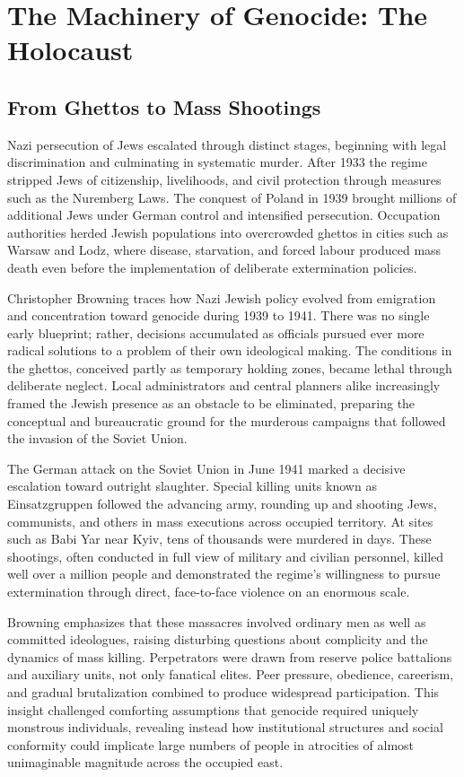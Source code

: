 \section{The Machinery of Genocide: The Holocaust}

\subsection{From Ghettos to Mass Shootings}
Nazi persecution of Jews escalated through distinct stages, beginning with legal discrimination and culminating in systematic murder. After 1933 the regime stripped Jews of citizenship, livelihoods, and civil protection through measures such as the Nuremberg Laws. The conquest of Poland in 1939 brought millions of additional Jews under German control and intensified persecution. Occupation authorities herded Jewish populations into overcrowded ghettos in cities such as Warsaw and Lodz, where disease, starvation, and forced labour produced mass death even before the implementation of deliberate extermination policies.

Christopher Browning traces how Nazi Jewish policy evolved from emigration and concentration toward genocide during 1939 to 1941. There was no single early blueprint; rather, decisions accumulated as officials pursued ever more radical solutions to a problem of their own ideological making. The conditions in the ghettos, conceived partly as temporary holding zones, became lethal through deliberate neglect. Local administrators and central planners alike increasingly framed the Jewish presence as an obstacle to be eliminated, preparing the conceptual and bureaucratic ground for the murderous campaigns that followed the invasion of the Soviet Union.

The German attack on the Soviet Union in June 1941 marked a decisive escalation toward outright slaughter. Special killing units known as Einsatzgruppen followed the advancing army, rounding up and shooting Jews, communists, and others in mass executions across occupied territory. At sites such as Babi Yar near Kyiv, tens of thousands were murdered in days. These shootings, often conducted in full view of military and civilian personnel, killed well over a million people and demonstrated the regime's willingness to pursue extermination through direct, face-to-face violence on an enormous scale.

Browning emphasizes that these massacres involved ordinary men as well as committed ideologues, raising disturbing questions about complicity and the dynamics of mass killing. Perpetrators were drawn from reserve police battalions and auxiliary units, not only fanatical elites. Peer pressure, obedience, careerism, and gradual brutalization combined to produce widespread participation. This insight challenged comforting assumptions that genocide required uniquely monstrous individuals, revealing instead how institutional structures and social conformity could implicate large numbers of people in atrocities of almost unimaginable magnitude across the occupied east.

